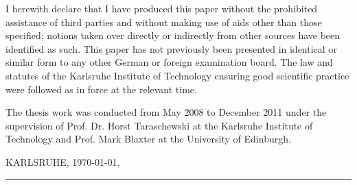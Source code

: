 


\begin{declaration}        %

  I herewith declare that I have produced this paper without the
  prohibited assistance of third parties and without making use of
  aids other than those specified; notions taken over directly or
  indirectly from other sources have been identified as such. This
  paper has not previously been presented in identical or similar form
  to any other German or foreign examination board. The law and
  statutes of the Karlsruhe Institute of Technology ensuring good
  scientific practice were followed as in force at the relevant time.


  The thesis work was conducted from May 2008 to December 2011 under
  the supervision of Prof. Dr. Horst Taraschewski at the Karlsruhe
  Institute of Technology and Prof. Mark Blaxter at the University of
  Edinburgh.

\vspace{10mm}

KARLSRUHE, \today,

\vspace{3cm}
\rule{0.4\textwidth}{0.4pt}

\end{declaration}



